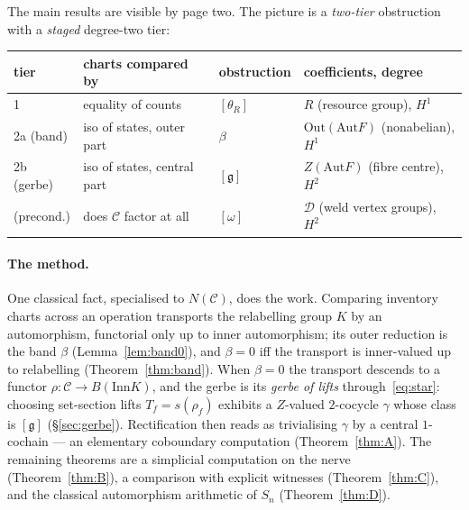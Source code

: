 \documentclass[11pt]{article}
\theoremstyle{definition}
\newcommand{\C}{\mathcal{C}}
\newcommand{\Aut}{\mathrm{Aut}}
\newcommand{\Inn}{\mathrm{Inn}}
\newcommand{\Out}{\mathrm{Out}}
\newcommand{\Zc}{Z}
\newcommand{\gerbe}{\mathfrak{g}}
\newcommand{\Dfr}{\mathcal{D}}
\begin{document}
The main results are visible by page two. The picture is a \emph{two-tier} obstruction with a
\emph{staged} degree-two tier:

\begin{center}
\begin{tabular}{llll}
\toprule
tier & charts compared by & obstruction & coefficients, degree\\
\midrule
1 & equality of counts & $[\theta_R]$ & $R$ (resource group), $H^1$\\
2a (band) & iso of states, outer part & $\beta$ & $\Out(\Aut F)$ (nonabelian), $H^1$\\
2b (gerbe) & iso of states, central part & $[\gerbe]$ & $Z(\Aut F)$ (fibre centre), $H^2$\\
\midrule
(precond.) & does $\C$ factor at all & $[\omega]$ & $\Dfr$ (weld vertex groups), $H^2$\\
\bottomrule
\end{tabular}
\end{center}

\paragraph{The method.}
One classical fact, specialised to $N(\C)$, does the work. Comparing inventory charts across an
operation transports the relabelling group $K$ by an automorphism, functorial only up to inner
automorphism; its outer reduction is the band $\beta$ (Lemma~\ref{lem:band0}), and $\beta=0$ iff
the transport is inner-valued up to relabelling (Theorem~\ref{thm:band}). When $\beta=0$ the
transport descends to a functor $\rho:\C\to B(\Inn K)$, and the gerbe is its \emph{gerbe of lifts}
through~\eqref{eq:star}: choosing set-section lifts $T_f=s(\rho_f)$ exhibits a $\Zc$-valued
$2$-cocycle $\gamma$ whose class is $[\gerbe]$ (\S\ref{sec:gerbe}). Rectification then reads as
trivialising $\gamma$ by a central $1$-cochain --- an elementary coboundary computation
(Theorem~\ref{thm:A}). The remaining theorems are a simplicial computation on the nerve
(Theorem~\ref{thm:B}), a comparison with explicit witnesses (Theorem~\ref{thm:C}), and the
classical automorphism arithmetic of $S_n$ (Theorem~\ref{thm:D}).
\end{document}
